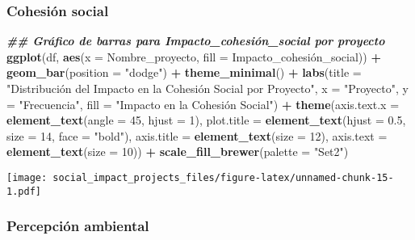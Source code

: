 \documentclass[
]{article}
\newenvironment{Shaded}{\begin{snugshade}}{\end{snugshade}}
\newcommand{\AttributeTok}[1]{\textcolor[rgb]{0.13,0.29,0.53}{#1}}
\newcommand{\DecValTok}[1]{\textcolor[rgb]{0.00,0.00,0.81}{#1}}
\newcommand{\DocumentationTok}[1]{\textcolor[rgb]{0.56,0.35,0.01}{\textbf{\textit{#1}}}}
\newcommand{\FloatTok}[1]{\textcolor[rgb]{0.00,0.00,0.81}{#1}}
\newcommand{\FunctionTok}[1]{\textcolor[rgb]{0.13,0.29,0.53}{\textbf{#1}}}
\newcommand{\NormalTok}[1]{#1}
\newcommand{\SpecialCharTok}[1]{\textcolor[rgb]{0.81,0.36,0.00}{\textbf{#1}}}
\newcommand{\StringTok}[1]{\textcolor[rgb]{0.31,0.60,0.02}{#1}}
\begin{document}
\subsubsection{\texorpdfstring{\textbf{Cohesión
social}}{Cohesión social}}\label{cohesiuxf3n-social}

\begin{Shaded}
\begin{Highlighting}[]
\DocumentationTok{\#\# Gráfico de barras para Impacto\_cohesión\_social por proyecto}
\FunctionTok{ggplot}\NormalTok{(df, }\FunctionTok{aes}\NormalTok{(}\AttributeTok{x =}\NormalTok{ Nombre\_proyecto, }\AttributeTok{fill =}\NormalTok{ Impacto\_cohesión\_social)) }\SpecialCharTok{+}
  \FunctionTok{geom\_bar}\NormalTok{(}\AttributeTok{position =} \StringTok{"dodge"}\NormalTok{) }\SpecialCharTok{+}
  \FunctionTok{theme\_minimal}\NormalTok{() }\SpecialCharTok{+}
  \FunctionTok{labs}\NormalTok{(}\AttributeTok{title =} \StringTok{"Distribución del Impacto en la Cohesión Social por Proyecto"}\NormalTok{,}
       \AttributeTok{x =} \StringTok{"Proyecto"}\NormalTok{, }\AttributeTok{y =} \StringTok{"Frecuencia"}\NormalTok{, }\AttributeTok{fill =} \StringTok{"Impacto en la Cohesión Social"}\NormalTok{) }\SpecialCharTok{+}
  \FunctionTok{theme}\NormalTok{(}\AttributeTok{axis.text.x =} \FunctionTok{element\_text}\NormalTok{(}\AttributeTok{angle =} \DecValTok{45}\NormalTok{, }\AttributeTok{hjust =} \DecValTok{1}\NormalTok{), }
        \AttributeTok{plot.title =} \FunctionTok{element\_text}\NormalTok{(}\AttributeTok{hjust =} \FloatTok{0.5}\NormalTok{, }\AttributeTok{size =} \DecValTok{14}\NormalTok{, }\AttributeTok{face =} \StringTok{"bold"}\NormalTok{),}
        \AttributeTok{axis.title =} \FunctionTok{element\_text}\NormalTok{(}\AttributeTok{size =} \DecValTok{12}\NormalTok{),}
        \AttributeTok{axis.text =} \FunctionTok{element\_text}\NormalTok{(}\AttributeTok{size =} \DecValTok{10}\NormalTok{)) }\SpecialCharTok{+}
  \FunctionTok{scale\_fill\_brewer}\NormalTok{(}\AttributeTok{palette =} \StringTok{"Set2"}\NormalTok{)}
\end{Highlighting}
\end{Shaded}

\texttt{[image: social\_impact\_projects\_files/figure-latex/unnamed-chunk-15-1.pdf]}

\subsubsection{\texorpdfstring{\textbf{Percepción
ambiental}}{Percepción ambiental}}\label{percepciuxf3n-ambiental}
\end{document}
